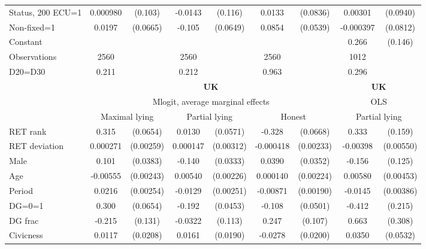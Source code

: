 \begin{tabular}{l|cccccc|cc}
Status, 200 ECU=1& 0.000980         &  (0.103)&  -0.0143         &  (0.116)&   0.0133         & (0.0836)&  0.00301         & (0.0940)\\
Non-fixed=1     &   0.0197         & (0.0665)&   -0.105         & (0.0649)&   0.0854         & (0.0539)&-0.000397         & (0.0812)\\
Constant        &                  &         &                  &         &                  &         &    0.266\sym{*}  &  (0.146)\\
\hline
Observations    &     2560         &         &     2560         &         &     2560         &         &     1012         &         \\
D20=D30         &    0.211         &         &    0.212         &         &    0.963         &         &    0.296         &         \\
\hline\hline
&\multicolumn{6}{c|}{\bf UK}&\multicolumn{2}{c}{\bf UK}\\ &\multicolumn{6}{c|}{Mlogit, average marginal effects }&\multicolumn{2}{c}{OLS}\\
                &\multicolumn{2}{c}{Maximal lying}&\multicolumn{2}{c}{Partial lying}&\multicolumn{2}{c}{Honest}  &\multicolumn{2}{c}{Partial lying}\\
\hline
RET rank        &    0.315\sym{***}& (0.0654)&   0.0130         & (0.0571)&   -0.328\sym{***}& (0.0668)&    0.333\sym{**} &  (0.159)\\
RET deviation   & 0.000271         &(0.00259)& 0.000147         &(0.00312)&-0.000418         &(0.00233)& -0.00398         &(0.00550)\\
Male            &    0.101\sym{***}& (0.0383)&   -0.140\sym{***}& (0.0333)&   0.0390         & (0.0352)&   -0.156         &  (0.125)\\
Age             & -0.00555\sym{**} &(0.00243)&  0.00540\sym{**} &(0.00226)& 0.000140         &(0.00224)&  0.00580         &(0.00453)\\
Period          &   0.0216\sym{***}&(0.00254)&  -0.0129\sym{***}&(0.00251)& -0.00871\sym{***}&(0.00190)&  -0.0145\sym{***}&(0.00386)\\
DG=0=1          &    0.300\sym{***}& (0.0654)&   -0.192\sym{***}& (0.0453)&   -0.108\sym{**} & (0.0501)&   -0.412\sym{*}  &  (0.215)\\
DG frac         &   -0.215         &  (0.131)&  -0.0322         &  (0.113)&    0.247\sym{**} &  (0.107)&    0.663\sym{**} &  (0.308)\\
Civicness       &   0.0117         & (0.0208)&   0.0161         & (0.0190)&  -0.0278         & (0.0200)&   0.0350         & (0.0532)\\

\end{tabular}

